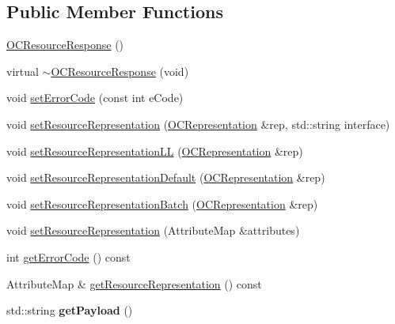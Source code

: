 \subsection*{Public Member Functions}
\begin{DoxyCompactItemize}
\item 
\hyperlink{classOC_1_1OCResourceResponse_ac4f7ddf88b36476c6a794be31e58fb8e}{O\+C\+Resource\+Response} ()
\item 
virtual \hyperlink{classOC_1_1OCResourceResponse_ae9531db0616407410535be8ef56e0f8f}{$\sim$\+O\+C\+Resource\+Response} (void)
\item 
void \hyperlink{classOC_1_1OCResourceResponse_af4f60806fc32df38799532ea4cf6d9c4}{set\+Error\+Code} (const int e\+Code)
\item 
void \hyperlink{classOC_1_1OCResourceResponse_aa26e157cb217d3486b6b6848ba241263}{set\+Resource\+Representation} (\hyperlink{classOC_1_1OCRepresentation}{O\+C\+Representation} \&rep, std\+::string interface)
\item 
void \hyperlink{classOC_1_1OCResourceResponse_adcefb4320aca3287d144c31c5539584a}{set\+Resource\+Representation\+L\+L} (\hyperlink{classOC_1_1OCRepresentation}{O\+C\+Representation} \&rep)
\item 
void \hyperlink{classOC_1_1OCResourceResponse_a36e5f5fe7f6a595db436a23536fc7cbc}{set\+Resource\+Representation\+Default} (\hyperlink{classOC_1_1OCRepresentation}{O\+C\+Representation} \&rep)
\item 
void \hyperlink{classOC_1_1OCResourceResponse_afd38a03154baa6b78cd26d33ec304cdb}{set\+Resource\+Representation\+Batch} (\hyperlink{classOC_1_1OCRepresentation}{O\+C\+Representation} \&rep)
\item 
void \hyperlink{classOC_1_1OCResourceResponse_aa2638af45ad173ffbf9a41e0c9ace13b}{set\+Resource\+Representation} (Attribute\+Map \&attributes)
\item 
int \hyperlink{classOC_1_1OCResourceResponse_ae88df3aa94f441634f5f8b775bcf9ec8}{get\+Error\+Code} () const 
\item 
Attribute\+Map \& \hyperlink{classOC_1_1OCResourceResponse_a94f1db85fa52b3f7a2b913fa544b732e}{get\+Resource\+Representation} () const 
\item 
\hypertarget{classOC_1_1OCResourceResponse_aac29e48fe8cfa463a63a6197065b4899}{}std\+::string {\bfseries get\+Payload} ()\label{classOC_1_1OCResourceResponse_aac29e48fe8cfa463a63a6197065b4899}

\end{DoxyCompactItemize}


